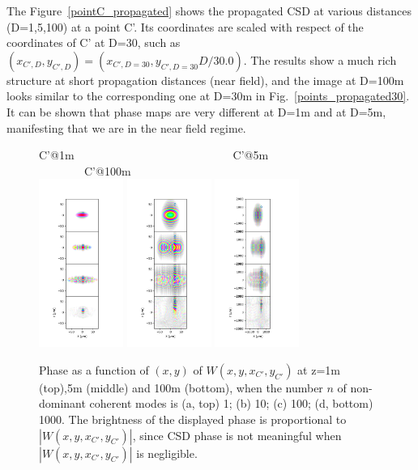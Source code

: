 \documentclass{iucr}              %
\newcommand{\inblue}[1]{{\color{blue}#1}}
\begin{document}
The Figure~\ref{pointC_propagated} shows the propagated CSD at various distances (D=1,5,100) at a point C'. Its coordinates are scaled with respect of the coordinates of C' at D=30, such as $(x_{C',D},y_{C',D})=(x_{C',D=30},y_{C',D=30} D / 30.0)$. The results show a much rich structure at short propagation distances (near field), and the image at D=100m looks similar to the corresponding one at D=30m in \inblue{Fig.~\ref{points_propagated30}}. It can be shown that phase maps are very different at D=1m and at D=5m, manifesting that we are in the near field regime.   


\begin{figure}
\caption{Phase as a function of $(x,y)$ of $W(x,y,x_{C'},y_{C'})$ at z=1m (top),5m (middle) and 100m (bottom), when the number $n$ of non-dominant coherent modes is (a, top) 1; (b) 10; (c) 100; (d, bottom) 1000. The brightness of the displayed phase is proportional to $|W(x,y,x_{C'},y_{C'})|$, since CSD phase is not meaningful when $|W(x,y,x_{C'},y_{C'})|$ is negligible.}
C'@1m~~~~~~~~~~~~~~~~~~~~~~~~~~~~C'@5m~~~~~~~~~~~~~~~~~~~~~~~~~~~~C'@100m\\
\includegraphics[width=2.75cm]{Figures/vx_id16a_C1_propagated.png}
\includegraphics[width=2.75cm]{Figures/vx_id16a_C5_propagated.png}
\includegraphics[width=2.75cm]{Figures/vx_id16a_C100_propagated.png}

\end{figure}
\end{document}

